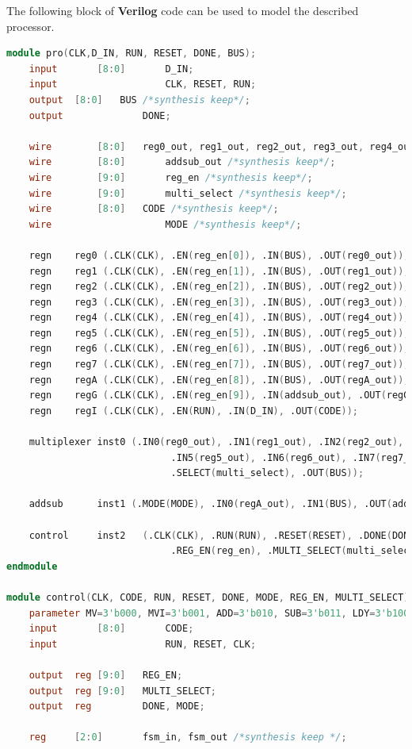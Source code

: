 The following block of \textbf{Verilog} code can be used to model the described processor.

\begin{lstlisting}[language=Verilog]
module pro(CLK,D_IN, RUN, RESET, DONE, BUS);
	input		[8:0]		D_IN;
	input					CLK, RESET, RUN;
	output	[8:0] 	BUS /*synthesis keep*/;
	output				DONE;
	
	wire		[8:0] 	reg0_out, reg1_out, reg2_out, reg3_out, reg4_out, reg5_out, reg6_out, reg7_out, regA_out, regG_out /*synthesis keep*/;
	wire		[8:0]		addsub_out /*synthesis keep*/;
	wire		[9:0]		reg_en /*synthesis keep*/;
	wire		[9:0]		multi_select /*synthesis keep*/;
	wire		[8:0] 	CODE /*synthesis keep*/;
	wire					MODE /*synthesis keep*/;
	
	regn	reg0 (.CLK(CLK), .EN(reg_en[0]), .IN(BUS), .OUT(reg0_out));
	regn	reg1 (.CLK(CLK), .EN(reg_en[1]), .IN(BUS), .OUT(reg1_out));
	regn	reg2 (.CLK(CLK), .EN(reg_en[2]), .IN(BUS), .OUT(reg2_out));
	regn	reg3 (.CLK(CLK), .EN(reg_en[3]), .IN(BUS), .OUT(reg3_out));
	regn	reg4 (.CLK(CLK), .EN(reg_en[4]), .IN(BUS), .OUT(reg4_out));
	regn	reg5 (.CLK(CLK), .EN(reg_en[5]), .IN(BUS), .OUT(reg5_out));
	regn	reg6 (.CLK(CLK), .EN(reg_en[6]), .IN(BUS), .OUT(reg6_out));
	regn	reg7 (.CLK(CLK), .EN(reg_en[7]), .IN(BUS), .OUT(reg7_out));
	regn	regA (.CLK(CLK), .EN(reg_en[8]), .IN(BUS), .OUT(regA_out));
	regn	regG (.CLK(CLK), .EN(reg_en[9]), .IN(addsub_out), .OUT(regG_out));
	regn	regI (.CLK(CLK), .EN(RUN), .IN(D_IN), .OUT(CODE));
	
	multiplexer inst0 (.IN0(reg0_out), .IN1(reg1_out), .IN2(reg2_out), .IN3(reg3_out), .IN4(reg4_out), 
							 .IN5(reg5_out), .IN6(reg6_out), .IN7(reg7_out), .IN8(regG_out), .IN9(D_IN), 
							 .SELECT(multi_select), .OUT(BUS));
							 
	addsub		inst1 (.MODE(MODE), .IN0(regA_out), .IN1(BUS), .OUT(addsub_out));
	
	control		inst2	(.CLK(CLK), .RUN(RUN), .RESET(RESET), .DONE(DONE), .CODE(CODE),
							 .REG_EN(reg_en), .MULTI_SELECT(multi_select), .MODE(MODE));
endmodule

module control(CLK, CODE, RUN, RESET, DONE, MODE, REG_EN, MULTI_SELECT);
	parameter MV=3'b000, MVI=3'b001, ADD=3'b010, SUB=3'b011, LDY=3'b100, UDX=3'b101, LDI=3'b110;  
	input		[8:0]		CODE;
	input					RUN, RESET, CLK;
	
	output	reg [9:0]	REG_EN;
	output	reg [9:0]	MULTI_SELECT;
	output	reg			DONE, MODE;
	
	reg		[2:0]		fsm_in, fsm_out /*synthesis keep */;


\end{lstlisting}
